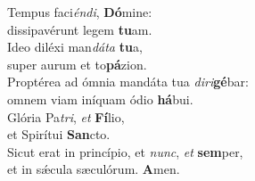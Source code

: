 \evenverse Tempus faci\textit{én}\textit{di}, \textbf{Dó}mine:~\*\\
\evenverse dissipavérunt legem \textbf{tu}am.\\
\oddverse Ideo diléxi man\textit{dá}\textit{ta} \textbf{tu}a,~\*\\
\oddverse super aurum et to\textbf{pá}zion.\\
\evenverse Proptérea ad ómnia mandáta tua \textit{di}\textit{ri}\textbf{gé}bar:~\*\\
\evenverse omnem viam iníquam ódio \textbf{há}bui.\\
\oddverse Glória Pa\textit{tri}, \textit{et} \textbf{Fí}lio,~\*\\
\oddverse et Spirítui \textbf{San}cto.\\
\evenverse Sicut erat in princípio, et \textit{nunc}, \textit{et} \textbf{sem}per,~\*\\
\evenverse et in sǽcula sæculórum. \textbf{A}men.\\
